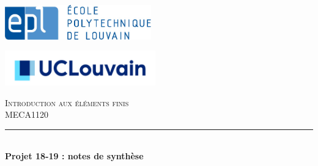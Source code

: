 \documentclass{article}
\begin{document}
\begin{titlepage} %
	\newcommand{\HRule}{\rule{\linewidth}{0.5mm}} %
	
	\begin{minipage}[t]{0.30\linewidth}
		\includegraphics[height=1.5cm]{Images/logo_EPL.jpg}
	\end{minipage} \hfill
	\begin{minipage}[t]{0.35\linewidth}
		\includegraphics[height=1.5cm]{Images/logo_UCL.jpg}
	\end{minipage}
	
	\center %
	
	
	
	
	\vspace{1.5cm}
	\textsc{\Large Introduction aux éléments finis}\\[0.5cm] %
	
	\textsc{\large MECA1120}\\[1.0cm] %
	
	
	\HRule\\[0.65cm]
	
	{\huge\bfseries Projet 18-19 : notes de synthèse}\\[0.4cm] %
	

\end{titlepage}
\end{document}
